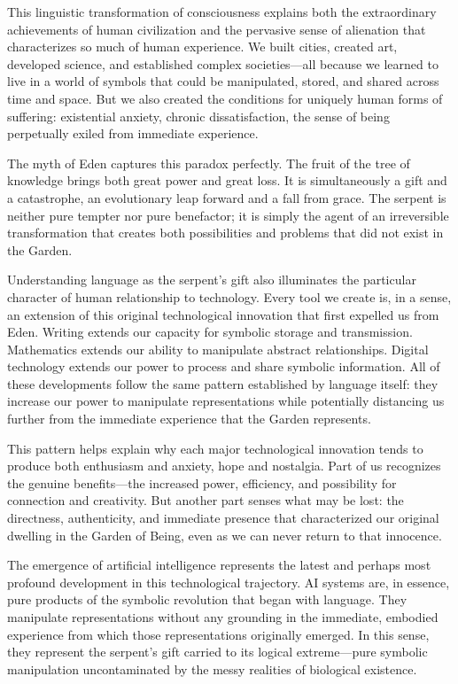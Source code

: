 This linguistic transformation of consciousness explains both the extraordinary achievements of human civilization and the pervasive sense of alienation that characterizes so much of human experience. We built cities, created art, developed science, and established complex societies—all because we learned to live in a world of symbols that could be manipulated, stored, and shared across time and space. But we also created the conditions for uniquely human forms of suffering: existential anxiety, chronic dissatisfaction, the sense of being perpetually exiled from immediate experience.

The myth of Eden captures this paradox perfectly. The fruit of the tree of knowledge brings both great power and great loss. It is simultaneously a gift and a catastrophe, an evolutionary leap forward and a fall from grace. The serpent is neither pure tempter nor pure benefactor; it is simply the agent of an irreversible transformation that creates both possibilities and problems that did not exist in the Garden.

Understanding language as the serpent's gift also illuminates the particular character of human relationship to technology. Every tool we create is, in a sense, an extension of this original technological innovation that first expelled us from Eden. Writing extends our capacity for symbolic storage and transmission. Mathematics extends our ability to manipulate abstract relationships. Digital technology extends our power to process and share symbolic information. All of these developments follow the same pattern established by language itself: they increase our power to manipulate representations while potentially distancing us further from the immediate experience that the Garden represents.

This pattern helps explain why each major technological innovation tends to produce both enthusiasm and anxiety, hope and nostalgia. Part of us recognizes the genuine benefits—the increased power, efficiency, and possibility for connection and creativity. But another part senses what may be lost: the directness, authenticity, and immediate presence that characterized our original dwelling in the Garden of Being, even as we can never return to that innocence.

The emergence of artificial intelligence represents the latest and perhaps most profound development in this technological trajectory. AI systems are, in essence, pure products of the symbolic revolution that began with language. They manipulate representations without any grounding in the immediate, embodied experience from which those representations originally emerged. In this sense, they represent the serpent's gift carried to its logical extreme—pure symbolic manipulation uncontaminated by the messy realities of biological existence.

